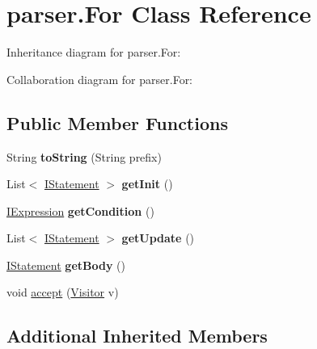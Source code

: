 \hypertarget{classparser_1_1_for}{}\section{parser.\+For Class Reference}
\label{classparser_1_1_for}


Inheritance diagram for parser.\+For\+:


Collaboration diagram for parser.\+For\+:
\subsection*{Public Member Functions}
\begin{DoxyCompactItemize}
\item 
String {\bfseries to\+String} (String prefix)\hypertarget{classparser_1_1_for_aa0d29b3306fb2f6bb9851c0f9c93fe05}{}\label{classparser_1_1_for_aa0d29b3306fb2f6bb9851c0f9c93fe05}

\item 
List$<$ \hyperlink{interfaceparser_1_1_i_statement}{I\+Statement} $>$ {\bfseries get\+Init} ()\hypertarget{classparser_1_1_for_a6d7ea4957b9865736ae5388bb06767d6}{}\label{classparser_1_1_for_a6d7ea4957b9865736ae5388bb06767d6}

\item 
\hyperlink{interfaceparser_1_1_i_expression}{I\+Expression} {\bfseries get\+Condition} ()\hypertarget{classparser_1_1_for_a9b140dc29f8084490410435ed63fc9ea}{}\label{classparser_1_1_for_a9b140dc29f8084490410435ed63fc9ea}

\item 
List$<$ \hyperlink{interfaceparser_1_1_i_statement}{I\+Statement} $>$ {\bfseries get\+Update} ()\hypertarget{classparser_1_1_for_aea1c06cf63fd484bc0af1d538569c892}{}\label{classparser_1_1_for_aea1c06cf63fd484bc0af1d538569c892}

\item 
\hyperlink{interfaceparser_1_1_i_statement}{I\+Statement} {\bfseries get\+Body} ()\hypertarget{classparser_1_1_for_a782fb56afeae812873f0da0f2aaebf5f}{}\label{classparser_1_1_for_a782fb56afeae812873f0da0f2aaebf5f}

\item 
void \hyperlink{classparser_1_1_for_a03151b9133d69076bb39d3b7c35e040d}{accept} (\hyperlink{interfacemain_1_1_visitor}{Visitor} v)
\end{DoxyCompactItemize}
\subsection*{Additional Inherited Members}


